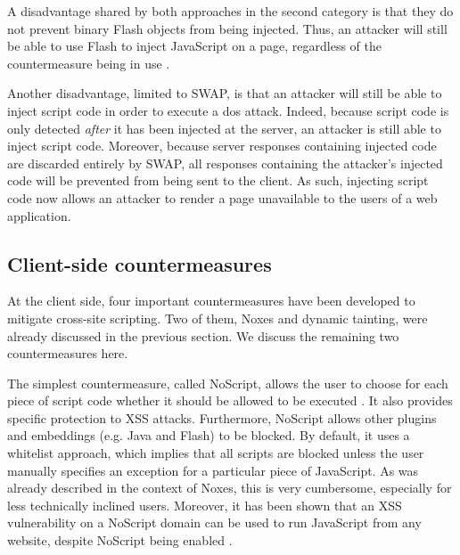 A disadvantage shared by both approaches in the second category is that they do not prevent binary Flash objects from being injected. Thus, an attacker will still be able to use Flash to inject JavaScript on a page, regardless of the countermeasure being in use \cite{Bisht2008,FlashJSattack}.

Another disadvantage, limited to SWAP, is that an attacker will still be able to inject script code in order to execute a \gls{dos} attack. Indeed, because script code is only detected \emph{after} it has been injected at the server, an attacker is still able to inject script code. Moreover, because server responses containing injected code are discarded entirely by SWAP, all responses containing the attacker's injected code will be prevented from being sent to the client. As such, injecting script code now allows an attacker to render a page unavailable to the users of a web application.

\subsection{Client-side countermeasures}

At the client side, four important countermeasures have been developed to mitigate cross-site scripting. Two of them, Noxes and dynamic tainting, were already discussed in the previous section. We discuss the remaining two countermeasures here.

The simplest countermeasure, called NoScript, allows the user to choose for each piece of script code whether it should be allowed to be executed \cite{NoScript}. It also provides specific protection to XSS attacks. Furthermore, NoScript allows other plugins and embeddings (e.g. Java and Flash) to be blocked. By default, it uses a whitelist approach, which implies that all scripts are blocked unless the user manually specifies an exception for a particular piece of JavaScript. As was already described in the context of Noxes, this is very cumbersome, especially for less technically inclined users. Moreover, it has been shown that an XSS vulnerability on a NoScript domain can be used to run JavaScript from any website, despite NoScript being enabled \cite{NoScriptCriticism}.

